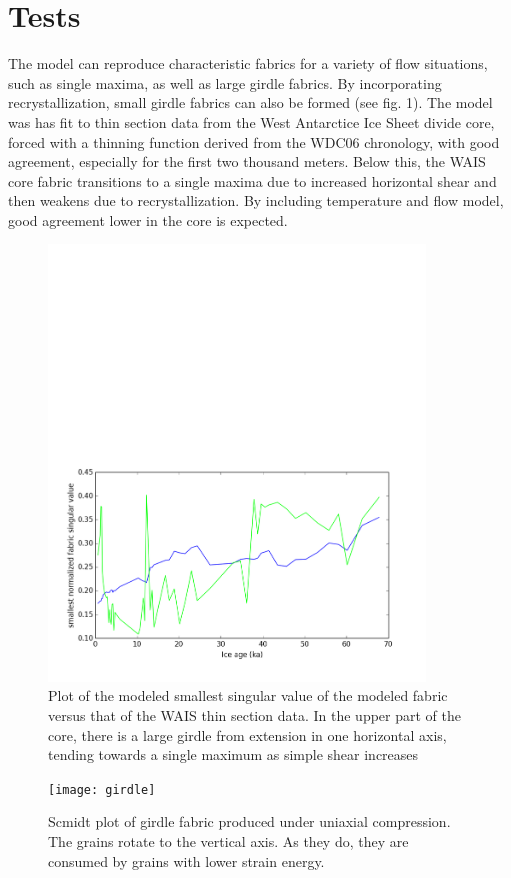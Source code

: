 \documentclass{article}
\begin{document}
\section{Tests}
The model can reproduce characteristic fabrics for a variety of flow situations, such as single maxima, as well as large girdle fabrics. By incorporating recrystallization, small girdle fabrics can also be formed (see fig. 1). The model was has fit to thin section data \citet{joan} from the West Antarctice Ice Sheet divide core, forced with a thinning function derived from the WDC06 chronology, with good agreement, especially for the first two thousand meters. Below this, the WAIS core fabric transitions to a single maxima due to increased horizontal shear and then weakens due to recrystallization. By including temperature and flow model, good agreement lower in the core is expected.
\begin{figure}
\caption{Plot of the modeled smallest  singular value of the modeled fabric versus that of the WAIS thin section data. In the upper part of the core, there is a large girdle from extension in one horizontal axis, tending towards a single maximum as simple shear increases}
\includegraphics[width=10cm]{waisfit}
\end{figure}
\begin{figure}
\caption{Scmidt plot of girdle fabric produced under uniaxial compression. The grains rotate to the vertical axis. As they do, they are consumed by grains with lower strain energy.} 
\texttt{[image: girdle]}
\end{figure}
\end{document}
